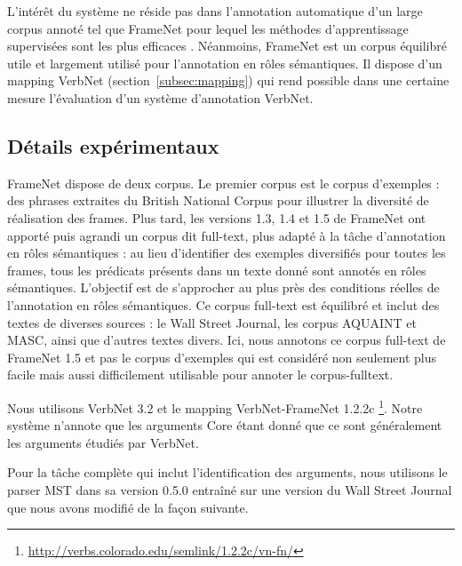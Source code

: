 L'intérêt du système ne réside pas dans l'annotation automatique d'un large
corpus annoté tel que FrameNet pour lequel les méthodes d'apprentissage
supervisées sont les plus efficaces \citep{das2014frame}. Néanmoins, FrameNet
est un corpus équilibré utile et largement utilisé pour l'annotation en rôles
sémantiques. Il dispose d'un mapping VerbNet (section~\ref{subsec:mapping}) qui
rend possible dans une certaine mesure l'évaluation d'un système d'annotation
VerbNet.

\subsection{Détails expérimentaux}
\label{subsec:details_exp}

FrameNet dispose de deux corpus. Le premier corpus est le corpus d'exemples :
des phrases extraites du British National Corpus pour illustrer la diversité de
réalisation des frames. Plus tard, les versions 1.3, 1.4 et 1.5 de FrameNet ont
apporté puis agrandi un corpus dit full-text, plus adapté à la tâche
d'annotation en rôles sémantiques : au lieu d'identifier des exemples
diversifiés pour toutes les frames, tous les prédicats présents dans un texte
donné sont annotés en rôles sémantiques. L'objectif est de s'approcher au plus
près des conditions réelles de l'annotation en rôles sémantiques. Ce corpus
full-text est équilibré et inclut des textes de diverses sources : le Wall
Street Journal, les corpus AQUAINT et MASC, ainsi que d'autres textes divers.
Ici, nous annotons ce corpus full-text de FrameNet 1.5 et pas le corpus
d'exemples qui est considéré non seulement plus facile mais aussi difficilement
utilisable pour annoter le corpus-fulltext.

Nous utilisons VerbNet 3.2 et le mapping VerbNet-FrameNet 1.2.2c
\footnote{\url{http://verbs.colorado.edu/semlink/1.2.2c/vn-fn/}}. Notre système
n'annote que les arguments Core étant donné que ce sont généralement les
arguments étudiés par VerbNet.

Pour la tâche complète qui inclut l'identification des arguments, nous
utilisons le parser MST dans sa version 0.5.0 \citep{mcdonald2006multilingual}
entraîné sur une version du Wall Street Journal que nous avons modifié de la
façon suivante.

